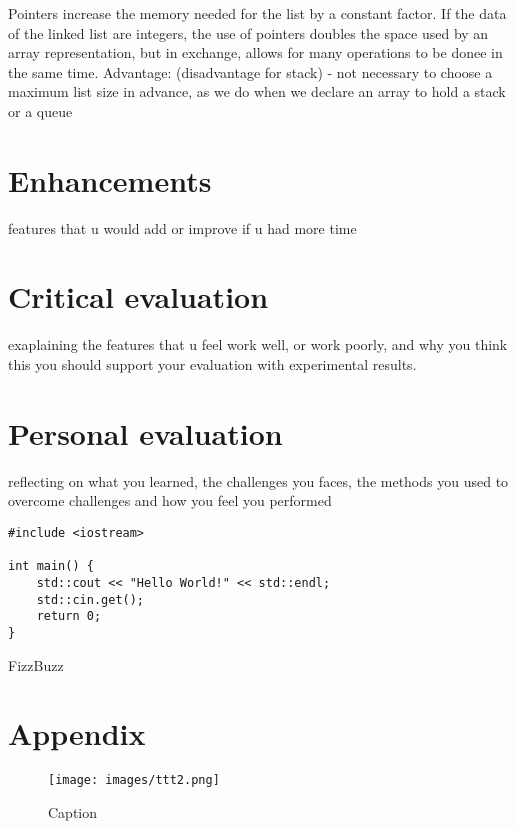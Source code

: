 \documentclass[10pt, a4paper]{article}
\begin{document}
Pointers increase the memory needed for the list by a constant factor. If the data of the linked list are integers, the use of pointers doubles the space used by an array representation, but in exchange, allows for many operations to be donee in the same time.
Advantage: (disadvantage for stack)
- not necessary to choose a maximum list size in advance, as we do when we declare an array to hold a stack or a queue

	\section{Enhancements}
features that u would add or improve if u had more time

	\section{Critical evaluation}
exaplaining the features that u feel work well, or work poorly, and why you think this you should support your evaluation with experimental results.

    \section{Personal evaluation}
reflecting on what you learned, the challenges you faces, the methods you used to overcome challenges and how you feel you performed


\begin{lstlisting}[caption = Hello World! in c++]
#include <iostream>

int main() {
    std::cout << "Hello World!" << std::endl;
    std::cin.get();
    return 0;
}
\end{lstlisting}



\begin{algorithm}[h]
\caption{FizzBuzz}
\end{algorithm}










\section{Appendix}
\begin{figure}[h!]
    \centering
    \texttt{[image: images/ttt2.png]}
    \caption{Caption}
    \label{fig:ttt2}
\end{figure}
\end{document}
